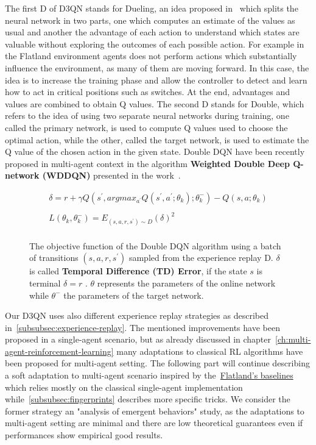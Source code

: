 \documentclass[11pt, a4paper, hidelinks]{report}
\begin{document}
The first D of D3QN stands for Dueling, an idea proposed in~\citep{dueling} which splits the neural network in two parts, one which computes an estimate of the values as usual and another the advantage of each action to understand which states are valuable without exploring the outcomes of each possible action.
For example in the Flatland environment agents does not perform actions which substantially influence the environment, as many of them are moving forward.
In this case, the idea is to increase the training phase and allow the controller to detect and learn how to act in critical positions such as switches.
At the end, advantages and values are combined to obtain Q values.
The second D stands for Double, which refers to the idea of using two separate neural networks during training, one called the primary network, is used to compute Q values used to choose the optimal action, while the other, called the target network, is used to estimate the Q value of the chosen action in the given state.
Double DQN have been recently proposed in multi-agent context in the algorithm \textbf{Weighted Double Deep Q-network (WDDQN)} presented in the work~\citep{weighted-ddqn}.

\begin{figure}
	\begin{gather*}
		\delta = r + \gamma Q\left( s^{'}, argmax_{a^{'}}Q\left( s^{'}, a^{'}; \theta_{k} \right); \theta_{k}^{-} \right) - Q(s, a; \theta_{k})\\\\
	    L(\theta_{k}, \theta_{k}^{-}) = E_{\left(s, a, r, s^{'}\right) \sim D} \left( \delta \right)^{2}\\
	\end{gather*}

	\caption{The objective function of the Double DQN algorithm using a batch of transitions $(s, a, r, s^{'})$ sampled from the experience replay D. $\delta$ is called \textbf{Temporal Difference (TD) Error}, if the state $s$ is terminal $\delta = r$ . $\theta$ represents the parameters of the online network while $\theta^{-}$ the parameters of the target network.}\label{fig:d3qn_objective}
\end{figure}

Our D3QN uses also different experience replay strategies as described in~\ref{subsubsec:experience-replay}.
The mentioned improvements have been proposed in a single-agent scenario, but as already discussed in chapter~\ref{ch:multi-agent-reinforcement-learning} many adaptations to classical RL algorithms have been proposed for multi-agent setting.
The following part will continue describing a soft adaptation to multi-agent scenario inspired by the~\href{https://gitlab.aicrowd.com/flatland/flatland-examples}{Flatland's baselines} which relies mostly on the classical single-agent implementation while~\ref{subsubsec:fingerprints} describes more specific tricks.
We consider the former strategy an "analysis of emergent behaviors" study, as the adaptations to multi-agent setting are minimal and there are low theoretical guarantees even if performances show empirical good results.
\end{document}
